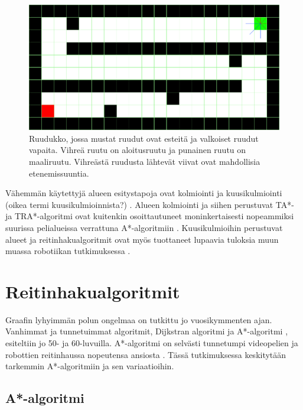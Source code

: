 \documentclass[utf8]{gradu3}
\begin{document}
\begin{figure}[h]
\centering
\includegraphics[width=15cm]{ruudukko_kuva.png}
\caption{Ruudukko, jossa mustat ruudut ovat esteitä ja valkoiset ruudut vapaita. Vihreä ruutu on aloitusruutu ja punainen ruutu on maaliruutu. Vihreästä ruudusta lähtevät viivat ovat mahdollisia etenemissuuntia.}
\label{ruudukkokuva}
\end{figure}

Vähemmän käytettyjä alueen esitystapoja ovat kolmiointi ja kuusikulmiointi (oikea termi kuusikulmioinnista?) \parencite{abd2015comprehensive}. Alueen kolmiointi ja siihen perustuvat TA*- ja TRA*-algoritmi ovat kuitenkin osoittautuneet moninkertaisesti nopeammiksi suurissa pelialueissa verrattuna A*-algoritmiin \parencite{demyen2006efficient}. Kuusikulmioihin perustuvat alueet ja reitinhakualgoritmit ovat myös tuottaneet lupaavia tuloksia muun muassa robotiikan tutkimuksessa \parencite{abd2015comprehensive}.

\section{Reitinhakualgoritmit}

Graafin lyhyimmän polun ongelmaa on tutkittu jo vuosikymmenten ajan. Vanhimmat ja tunnetuimmat algoritmit, Dijkstran algoritmi \parencite{dijkstra1959note} ja A*-algoritmi \parencite{hart1968formal}, esiteltiin jo 50- ja 60-luvuilla. A*-algoritmi on selvästi tunnetumpi videopelien ja robottien reitinhaussa nopeutensa ansiosta \parencite{cui2011based,abd2015comprehensive,botea2013pathfinding}. Tässä tutkimuksessa keskitytään tarkemmin A*-algoritmiin ja sen variaatioihin.

\subsection{A*-algoritmi}
\end{document}

